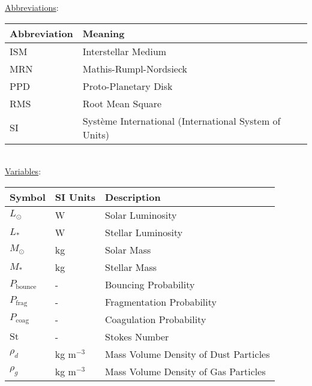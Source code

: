 \newpage
\underline{Abbreviations}:
\begin{table}[h!]
    \begin{tabular}{|l|l|}
        \hline
        \textbf{Abbreviation}   & \textbf{Meaning} \\
        \hline
        ISM                     & Interstellar Medium \\
        \hline
        MRN                     & Mathis-Rumpl-Nordsieck \\
        \hline
        PPD                     & Proto-Planetary Disk \\
        \hline
        RMS                     & Root Mean Square \\
        \hline
        SI                      & Système International (International System of Units) \\
        \hline                  %
    \end{tabular}
\end{table} \ \\ 

\underline{Variables}:
\begin{table}[h!]
    \begin{tabular}{|l|l|l|}
        \hline
        \textbf{Symbol}     & \textbf{SI Units}     & \textbf{Description}
        \\ \hline
        $L_\odot$           & W                     & Solar Luminosity 
        \\ \hline
        $L_*$               & W                     & Stellar Luminosity 
        \\ \hline
        $M_\odot$           & kg                    & Solar Mass 
        \\ \hline
        $M_*$               & kg                    & Stellar Mass 
        \\ \hline
        $P_\text{bounce}$   & -                     & Bouncing Probability
        \\ \hline
        $P_\text{frag}$     & -                     & Fragmentation Probability
        \\ \hline
        $P_\text{coag}$     & -                     & Coagulation Probability
        \\ \hline
        $\text{St}$         & -                     & Stokes Number 
        \\ \hline
        $\rho_d$            & kg m$^{-3}$           & Mass Volume Density of Dust Particles 
        \\ \hline
        $\rho_g$            & kg m$^{-3}$           & Mass Volume Density of Gas Particles 
        \\ \hline
    \end{tabular}
\end{table} \ \\ 

